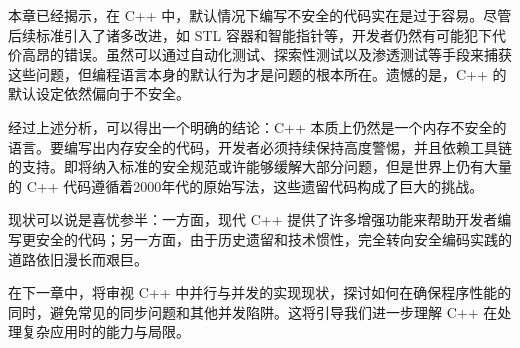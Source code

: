 本章已经揭示，在 C++ 中，默认情况下编写不安全的代码实在是过于容易。尽管后续标准引入了诸多改进，如 STL 容器和智能指针等，开发者仍然有可能犯下代价高昂的错误。虽然可以通过自动化测试、探索性测试以及渗透测试等手段来捕获这些问题，但编程语言本身的默认行为才是问题的根本所在。遗憾的是，C++ 的默认设定依然偏向于不安全。

经过上述分析，可以得出一个明确的结论：C++ 本质上仍然是一个内存不安全的语言。要编写出内存安全的代码，开发者必须持续保持高度警惕，并且依赖工具链的支持。即将纳入标准的安全规范或许能够缓解大部分问题，但是世界上仍有大量的 C++ 代码遵循着2000年代的原始写法，这些遗留代码构成了巨大的挑战。

现状可以说是喜忧参半：一方面，现代 C++ 提供了许多增强功能来帮助开发者编写更安全的代码；另一方面，由于历史遗留和技术惯性，完全转向安全编码实践的道路依旧漫长而艰巨。

在下一章中，将审视 C++ 中并行与并发的实现现状，探讨如何在确保程序性能的同时，避免常见的同步问题和其他并发陷阱。这将引导我们进一步理解 C++ 在处理复杂应用时的能力与局限。